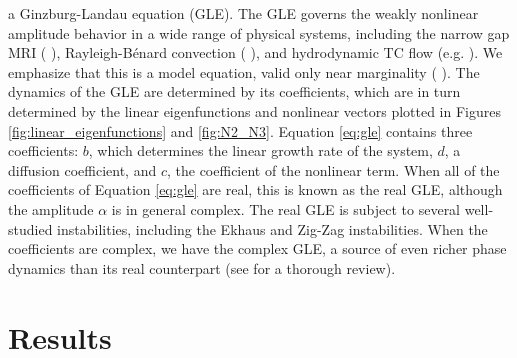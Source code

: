 \documentclass{emulateapj}
\newcommand{\citei}[1]{\citeauthor{#1} \citeyear{#1}}
\begin{document}
a Ginzburg-Landau equation (GLE). The GLE governs the weakly nonlinear amplitude behavior in a wide range of physical systems, including the narrow gap MRI (\citei{Umurhan:2007hs}), Rayleigh-B\'enard convection (\citei{Newell:1969wr}), and hydrodynamic TC flow (e.g. \citei{Recktenwald:1993}). We emphasize that this is a model equation, valid only near marginality (\citei{Cross:1993el}). The dynamics of the GLE are determined by its coefficients, which are in turn determined by the linear eigenfunctions and nonlinear vectors plotted in Figures \ref{fig:linear_eigenfunctions} and \ref{fig:N2_N3}. Equation \ref{eq:gle} contains three coefficients: $b$, which determines the linear growth rate of the system, $d$, a diffusion coefficient, and $c$, the coefficient of the nonlinear term. When all of the coefficients of Equation \ref{eq:gle} are real, this is known as the real GLE, although the amplitude $\alpha$ is in general complex. The real GLE is subject to several well-studied instabilities, including the Ekhaus and Zig-Zag instabilities. When the coefficients are complex, we have the complex GLE, a source of even richer phase dynamics than its real counterpart (see \citei{Aranson:2002} for a thorough review).

\section{Results}
\label{sec:results}
\end{document}
